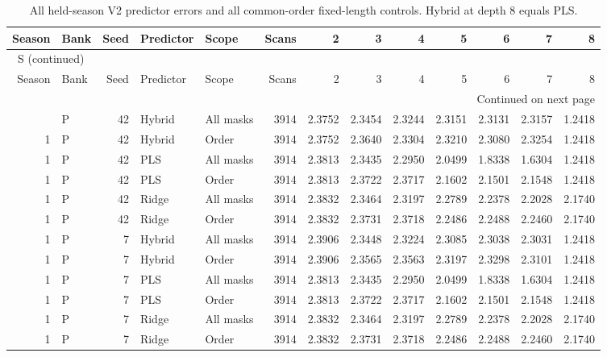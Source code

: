 \documentclass[10pt,a4paper]{article}
\renewcommand{\thetable}{S\arabic{table}}
\begin{document}
\clearpage
\begin{landscape}
\begingroup\footnotesize
\setlength{\tabcolsep}{3.5pt}
\renewcommand{\arraystretch}{1.10}
\begin{longtable}{rlrllrrrrrrrr}
\caption{All held-season V2 predictor errors and all common-order fixed-length controls. Hybrid at depth 8 equals PLS.}\label{tab:v2predictors}\\
\toprule
Season & Bank & Seed & Predictor & Scope & Scans & 2 & 3 & 4 & 5 & 6 & 7 & 8 \\
\midrule
\endfirsthead
\multicolumn{13}{l}{\tablename~\thetable{} (continued)}\\
\toprule
Season & Bank & Seed & Predictor & Scope & Scans & 2 & 3 & 4 & 5 & 6 & 7 & 8 \\
\midrule
\endhead
\midrule
\multicolumn{13}{r}{Continued on next page}\\
\endfoot
\bottomrule
\endlastfoot
1 & P & 42 & Hybrid & All masks & 3914 & 2.3752 & 2.3454 & 2.3244 & 2.3151 & 2.3131 & 2.3157 & 1.2418 \\
1 & P & 42 & Hybrid & Order & 3914 & 2.3752 & 2.3640 & 2.3304 & 2.3210 & 2.3080 & 2.3254 & 1.2418 \\
1 & P & 42 & PLS & All masks & 3914 & 2.3813 & 2.3435 & 2.2950 & 2.0499 & 1.8338 & 1.6304 & 1.2418 \\
1 & P & 42 & PLS & Order & 3914 & 2.3813 & 2.3722 & 2.3717 & 2.1602 & 2.1501 & 2.1548 & 1.2418 \\
1 & P & 42 & Ridge & All masks & 3914 & 2.3832 & 2.3464 & 2.3197 & 2.2789 & 2.2378 & 2.2028 & 2.1740 \\
1 & P & 42 & Ridge & Order & 3914 & 2.3832 & 2.3731 & 2.3718 & 2.2486 & 2.2488 & 2.2460 & 2.1740 \\
1 & P & 7 & Hybrid & All masks & 3914 & 2.3906 & 2.3448 & 2.3224 & 2.3085 & 2.3038 & 2.3031 & 1.2418 \\
1 & P & 7 & Hybrid & Order & 3914 & 2.3906 & 2.3565 & 2.3563 & 2.3197 & 2.3298 & 2.3101 & 1.2418 \\
1 & P & 7 & PLS & All masks & 3914 & 2.3813 & 2.3435 & 2.2950 & 2.0499 & 1.8338 & 1.6304 & 1.2418 \\
1 & P & 7 & PLS & Order & 3914 & 2.3813 & 2.3722 & 2.3717 & 2.1602 & 2.1501 & 2.1548 & 1.2418 \\
1 & P & 7 & Ridge & All masks & 3914 & 2.3832 & 2.3464 & 2.3197 & 2.2789 & 2.2378 & 2.2028 & 2.1740 \\
1 & P & 7 & Ridge & Order & 3914 & 2.3832 & 2.3731 & 2.3718 & 2.2486 & 2.2488 & 2.2460 & 2.1740 \\

\end{longtable}
\end{landscape}
\end{document}
